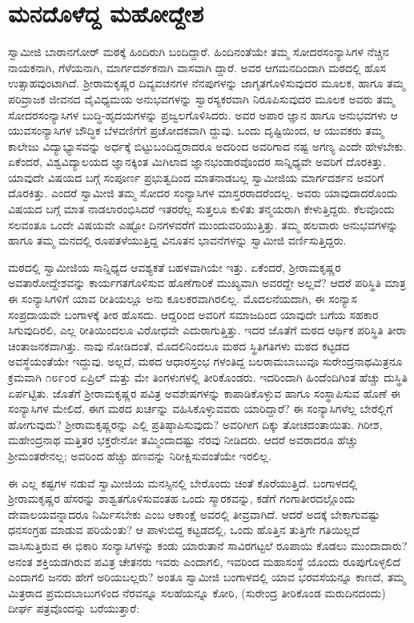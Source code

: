 
\chapter{ಮನದೊಳೆದ್ದ ಮಹೋದ್ದೇಶ}

\noindent

ಸ್ವಾಮೀಜಿ ಬಾರಾನಗೋರ್ ಮಠಕ್ಕೆ ಹಿಂದಿರುಗಿ ಬಂದಿದ್ದಾರೆ. ಹಿಂದಿನಂತೆಯೇ ತಮ್ಮ ಸೋದರಸಂನ್ಯಾಸಿಗಳ ನೆಚ್ಚಿನ ನಾಯಕನಾಗಿ, ಗೆಳೆಯನಾಗಿ, ಮಾರ್ಗದರ್ಶಕನಾಗಿ ವಾಸವಾಗಿ ದ್ದಾರೆ. ಅವರ ಆಗಮನದಿಂದಾಗಿ ಮಠದಲ್ಲಿ ಹೊಸ ಉತ್ಸಾಹವುಂಟಾಗಿದೆ. ಶ್ರೀರಾಮಕೃಷ್ಣರ ದಿವ್ಯವಚನಗಳ ನೆನಪುಗಳನ್ನು ಜಾಗೃತಗೊಳಿಸುವುದರ ಮೂಲಕ, ಹಾಗೂ ತಮ್ಮ ಪರಿವ್ರಾಜಕ ಜೀವನದ ವೈವಿಧ್ಯಮಯ ಅನುಭವಗಳನ್ನು ಸ್ವಾರಸ್ಯಕರವಾಗಿ ನಿರೂಪಿಸುವುದರ ಮೂಲಕ ಅವರು ತಮ್ಮ ಸೋದರಸಂನ್ಯಾಸಿಗಳ ಬುದ್ಧಿ-ಹೃದಯಗಳನ್ನು ಪ್ರಜ್ವಲಗೊಳಿಸಿದರು. ಅವರ ಅಪಾರ ಜ್ಞಾನ ಹಾಗೂ ಅನುಭವಗಳು ಆ ಯುವಸಂನ್ಯಾಸಿಗಳ ಬೌದ್ಧಿಕ ಬೆಳವಣಿಗೆಗೆ ಪ್ರಚೋದಕವಾಗಿ ದ್ದುವು. ಒಂದು ದೃಷ್ಟಿಯಿಂದ, ಆ ಯುವಕರು ತಮ್ಮ ಕಾಲೇಜು ವಿದ್ಯಾಭ್ಯಾಸವನ್ನು ಅರ್ಧಕ್ಕೆ ಬಿಟ್ಟುಬಂದಿದ್ದರಾದರೂ ಅದರಿಂದ ಅವರಿಗಾದ ನಷ್ಟ ಅಗಣ್ಯ ಎಂದೇ ಹೇಳಬೇಕು. ಏಕೆಂದರೆ, ವಿಶ್ವವಿದ್ಯಾಲಯದ ಜ್ಞಾನಕ್ಕಿಂತ ಮಿಗಿಲಾದ ಜ್ಞಾನಭಂಡಾರವೊಂದರ ಸಾನ್ನಿಧ್ಯವೇ ಅವರಿಗೆ ದೊರಕಿತ್ತು. ಯಾವುದೇ ವಿಷಯದ ಬಗ್ಗೆ ಸಂಪೂರ್ಣ ಪ್ರಭುತ್ವದಿಂದ ಮಾತನಾಡಬಲ್ಲ ಸ್ವಾಮೀಜಿಯ ಮಾರ್ಗದರ್ಶನ ಅವರಿಗೆ ದೊರಕಿತ್ತು. ಎಂದರೆ ಸ್ವಾಮೀಜಿ ತಮ್ಮ ಸೋದರ ಸಂನ್ಯಾಸಿಗಳ ಮಾಸ್ತರರಾದರೆಂದಲ್ಲ. ಅವರು ಯಾವುದಾದರೊಂದು ವಿಷಯದ ಬಗ್ಗೆ ಮಾತ ನಾಡಲಾರಂಭಿಸಿದರೆ ಇತರರೆಲ್ಲ ಸುತ್ತಲೂ ಕುಳಿತು ತನ್ಮಯರಾಗಿ ಕೇಳುತ್ತಿದ್ದರು. ಕೆಲವೊಂದು ಸಲವಂತೂ ಒಂದೇ ವಿಷಯವೇ ಎಷ್ಟೋ ದಿನಗಳವರೆಗೆ ಮುಂದುವರಿಯುತ್ತಿತ್ತು. ತಮ್ಮ ಹಲವಾರು ಅನುಭವಗಳನ್ನು ಹಾಗೂ ತಮ್ಮ ಮನದಲ್ಲಿ ರೂಪತಳೆಯುತ್ತಿದ್ದ ವಿನೂತನ ಭಾವನೆಗಳನ್ನು ಸ್ವಾಮೀಜಿ ವರ್ಣಿಸುತ್ತಿದ್ದರು.

ಮಠದಲ್ಲಿ ಸ್ವಾಮೀಜಿಯ ಸಾನ್ನಿಧ್ಯದ ಆವಶ್ಯಕತೆ ಬಹಳವಾಗಿಯೇ ಇತ್ತು. ಏಕೆಂದರೆ, ಶ್ರೀರಾಮಕೃಷ್ಣರ ಅವತಾರೋದ್ದೇಶವನ್ನು ಕಾರ್ಯಗತಗೊಳಿಸುವ ಹೊಣೆಗಾರಿಕೆ ಮುಖ್ಯವಾಗಿ ಅವರದ್ದೇ ಅಲ್ಲವೆ? ಆದರೆ ಪರಿಸ್ಥಿತಿ ಮಾತ್ರ ಈ ಸಂನ್ಯಾಸಿಗಳಿಗೆ ಯಾವ ರೀತಿಯಲ್ಲೂ ಅನು ಕೂಲಕರವಾಗಿರಲಿಲ್ಲ. ಮೊದಲನೆಯದಾಗಿ, ಈ ಸಂನ್ಯಾಸ ಸಂಪ್ರದಾಯವೇ ಬಂಗಾಳಕ್ಕೆ ತೀರ ಹೊಸದು. ಆದ್ದರಿಂದ ಅವರಿಗೆ ಸಮಾಜದಿಂದ ಯಾವುದೇ ಬಗೆಯ ಸಹಕಾರ ಸಿಗುವುದಿರಲಿ, ಎಲ್ಲ ರೀತಿಯಿಂದಲೂ ವಿರೋಧವೇ ಎದುರಾಗುತ್ತಿತ್ತು. ಇದರ ಜೊತೆಗೆ ಮಠದ ಆರ್ಥಿಕ ಪರಿಸ್ಥಿತಿ ತೀರಾ ಚಿಂತಾಜನಕವಾಗಿತ್ತು. ನಾವು ನೋಡಿದಂತೆ, ಮೊದಲಿನಿಂದಲೂ ಮಠದ ಸ್ಥಿತಿಗತಿಗಳು ಮಠದ ಕಟ್ಟಡದ ಅವಸ್ಥೆಯಂತೆಯೇ ಇದ್ದುವು. ಅಲ್ಲದೆ, ಮಠದ ಆಧಾರಸ್ತಂಭ ಗಳಂತಿದ್ದ ಬಲರಾಮಬಾಬುವೂ ಸುರೇಂದ್ರನಾಥಮಿತ್ರನೂ ಕ್ರಮವಾಗಿ ೧೮೯೦ರ ಏಪ್ರಿಲ್ ಮತ್ತು ಮೇ ತಿಂಗಳುಗಳಲ್ಲಿ ತೀರಿಕೊಂಡರು. ಇದರಿಂದಾಗಿ ಹಿಂದೆಂದಿಗಿಂತ ಹೆಚ್ಚು ದುಸ್ಥಿತಿ ಏರ್ಪಟ್ಟಿತು. ಜೊತೆಗೆ ಶ್ರೀರಾಮಕೃಷ್ಣರ ಪವಿತ್ರ ಅವಶೇಷಗಳನ್ನು ಕಾಪಾಡಿಕೊಳ್ಳುವ ಹಾಗೂ ಸಂಸ್ಥಾಪಿಸುವ ಹೊಣೆ ಈ ಸಂನ್ಯಾಸಿಗಳ ಮೇಲಿದೆ. ಈಗ ಮಠದ ಖರ್ಚನ್ನು ವಹಿಸಿಕೊಳ್ಳುವವರು ಯಾರಿದ್ದಾರೆ? ಈ ಸಂನ್ಯಾಸಿಗಳೆಲ್ಲ ಬೇರೆಲ್ಲಿಗೆ ಹೋಗುವುದು? ಶ್ರೀರಾಮಕೃಷ್ಣರನ್ನು ಎಲ್ಲಿ ಪ್ರತಿಷ್ಠಾಪಿಸುವುದು? ಅವರಿಗೀಗ ದಿಕ್ಕು ತೋಚದಂತಾಯಿತು. ಗಿರೀಶ, ಮಹೇಂದ್ರನಾಥ ಮತ್ತಿತರ ಭಕ್ತರೇನೋ ತಮ್ಮಿಂದಾದಷ್ಟು ನೆರವು ನೀಡಿದರು. ಆದರೆ ಅವರಾದರೂ ಹೆಚ್ಚು ಶ್ರೀಮಂತರೇನಲ್ಲ; ಅವರಿಂದ ಹೆಚ್ಚು ಹಣವನ್ನು ನಿರೀಕ್ಷಿಸುವಂತೆಯೇ ಇರಲಿಲ್ಲ.

ಈ ಎಲ್ಲ ಕಷ್ಟಗಳ ನಡುವೆ ಸ್ವಾಮೀಜಿಯ ಮನಸ್ಸಿನಲ್ಲಿ ಬೇರೊಂದು ಚಿಂತೆ ಕೊರೆಯುತ್ತಿದೆ. ಬಂಗಾಳದಲ್ಲಿ ಶ್ರೀರಾಮಕೃಷ್ಣರ ಹೆಸರನ್ನು ಶಾಶ್ವತಗೊಳಿಸುವಂತಹ ಒಂದು ಸ್ಮಾರಕವನ್ನು, ಕಡೆಗೆ ಗಂಗಾತೀರದಲ್ಲೊಂದು ದೇವಾಲಯವನ್ನಾದರೂ ನಿರ್ಮಿಸಬೇಕು ಎಂಬ ಆಕಾಂಕ್ಷೆ ಅವರಲ್ಲಿ ತೀವ್ರವಾಗಿದೆ. ಆದರೆ ಅದಕ್ಕೆ ಬೇಕಾಗುವಷ್ಟು ಧನಸಂಗ್ರಹ ಮಾಡುವ ಪರಿಯೆಂತು? ಆ ಪಾಳುಬಿದ್ದ ಕಟ್ಟಡದಲ್ಲಿ, ಒಂದು ಹೊತ್ತಿನ ತುತ್ತಿಗೇ ಗತಿಯಿಲ್ಲದೆ ವಾಸಿಸುತ್ತಿರುವ ಈ ಭಿಕಾರಿ ಸಂನ್ಯಾಸಿಗಳನ್ನು ಕಂಡು ಯಾರುತಾನೆ ಸಾವಿರಗಟ್ಟಲೆ ರೂಪಾಯಿ ಕೊಡಲು ಮುಂದಾದಾರು? ಅನಂತ ಶಕ್ತಿಯಡಗಿರುವ ಪವಿತ್ರ ಚೇತನರು ಇವರು ಎಂದಾಗಲಿ, ಇವರಿಂದ ಮಹಾಸಂಸ್ಥೆ ಯೊಂದು ರೂಪುಗೊಳ್ಳಲಿದೆ ಎಂದಾಗಲಿ ಜನರು ಹೇಗೆ ಅರಿಯಬಲ್ಲರು? ಅಂತೂ ಸ್ವಾಮೀಜಿ ಬಂಗಾಳದಲ್ಲಿ ಯಾವ ಭರವಸೆಯನ್ನೂ ಕಾಣದೆ, ತಮ್ಮ ಮಿತ್ರರಾದ ಪ್ರಮದಬಾಬುಗಳಿಂದ ನೆರವನ್ನೂ ಸಲಹೆಯನ್ನೂ ಕೋರಿ, (ಸುರೇಂದ್ರ ತೀರಿಕೊಂಡ ಮರುದಿನದಂದು) ದೀರ್ಘ ಪತ್ರವೊಂದನ್ನು ಬರೆಯುತ್ತಾರೆ:

